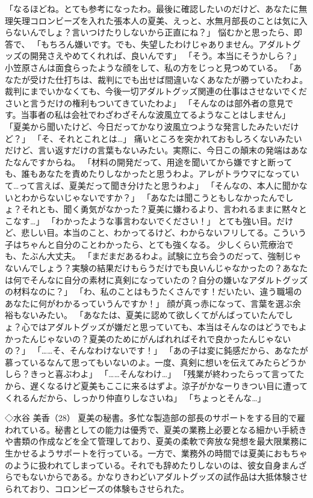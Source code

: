 「なるほどね。とても参考になったわ。最後に確認したいのだけど、あなたに無理矢理コロンビーズを入れた張本人の夏美、えっと、水無月部長のことは気に入らないんでしょ？言いつけたりしないから正直にね？」
悩むかと思ったら、即答で、
「もちろん嫌いです。でも、失望したわけじゃありません。アダルトグッズの開発さえやめてくれれば、良いんです」
「そう。本当にそうかしら？」
小笠原さんは面食らったような顔をして、私の方をじっと見つめている。
「あなたが受けた仕打ちは、裁判にでも出せば間違いなくあなたが勝っていたわよ。裁判にまでいかなくても、今後一切アダルトグッズ関連の仕事はさせないでくださいと言うだけの権利もついてきていたわよ」
「そんなのは部外者の意見です。当事者の私は会社でわざわざそんな波風立てるようなことはしません」
「夏美から聞いたけど、今日だってかなり波風立つような発言したみたいだけど？」
「そ、それとこれとは…」
痛いところを突かれておもしろくないみたいだけど、言い返すだけの言葉もないみたい。実際に、今日この顛末の発端はあなたなんですからね。
「材料の開発だって、用途を聞いてから嫌ですと断っても、誰もあなたを責めたりしなかったと思うわよ。アレがトラウマになっていて…って言えば、夏美だって聞き分けたと思うわよ」
「そんなの、本人に聞かないとわからないじゃないですか？」
「あなたは聞こうともしなかったんでしょ？それとも、聞く勇気がなかった？夏美に嫌わるより、言われるままに黙々とこなす…」
「わかったような事言わないでください！」
とても強い目。だけど、悲しい目。本当のこと、わかってるけど、わからないフリしてる。こういう子はちゃんと自分のことわかったら、とても強くなる。
少しくらい荒療治でも、たぶん大丈夫。
「まだまだあるわよ。試験に立ち会うのだって、強制じゃないんでしょう？実験の結果だけもらうだけでも良いんじゃなかったの？あなたは何でそんなに自分の素材に真剣になっていたの？自分の嫌いなアダルトグッズの材料なのに？」
「わ、私のことはもうたくさんです！だいたい、違う職場のあなたに何がわかるっていうんですか！」
顔が真っ赤になって、言葉を選ぶ余裕もないみたい。
「あなたは、夏美に認めて欲しくてがんばっていたんでしょ？心ではアダルトグッズが嫌だと思っていても、本当はそんなのはどうでもよかったんじゃないの？夏美のためにがんばれればそれで良かったんじゃないの？」
「……そ、そんなわけないです！」
「あの子は変に鈍感だから、あなたが慕っているなんて思ってもいないのよ。一度、真剣に想いを伝えてみたらどうかしら？きっと喜ぶわよ」
「……そんなわけ…」
「残業が終わったらって言ってたから、遅くなるけど夏美もここに来るはずよ。涼子がかなーりきつい目に遭ってくれるんだから、しっかり仲直りしなさいね」
「ちょっとそんな…」



◇水谷 美香（28）
夏美の秘書。多忙な製造部の部長のサポートをする目的で雇われている。秘書としての能力は優秀で、夏美の業務上必要となる細かい手続きや書類の作成などを全て管理しており、夏美の柔軟で奔放な発想を最大限業務に生かせるようサポートを行っている。一方で、業務外の時間では夏美におもちゃのように扱われてしまっている。それでも辞めたりしないのは、彼女自身まんざらでもないからである。かなりきわどいアダルトグッズの試作品は大抵体験させられており、コロンビーズの体験もさせられた。




